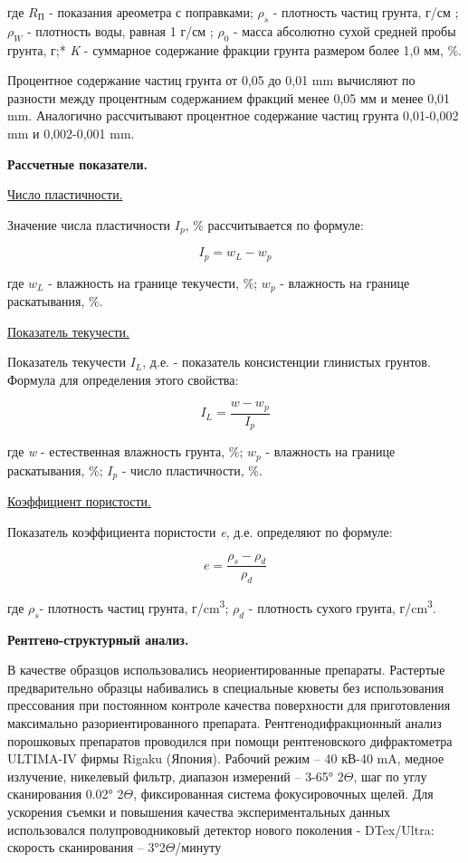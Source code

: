 где $R_\text{П}$ - показания ареометра с поправками;
$\rho_s$ - плотность частиц грунта, г/см ;
$\rho_W$ - плотность воды, равная 1 г/см ;
$\rho_0$ - масса абсолютно сухой средней пробы грунта, г;*
\textit{K} - суммарное содержание фракции грунта размером более 1,0 мм, \%.

Процентное содержание частиц грунта от 0,05 до 0,01 \si{\milli\meter} вычисляют по разности
между процентным содержанием фракций менее 0,05 мм и менее 0,01 \si{\milli\meter}.
Аналогично рассчитывают процентное содержание частиц грунта 0,01-0,002
\si{\milli\meter} и 0,002-0,001 \si{\milli\meter}.
 
\textbf{Рассчетные показатели.}

\underline{Число пластичности.}

 Значение числа пластичности \textit{$I_p$}, \% рассчитывается по формуле:

 \[
    \textit{$I_p$} = \textit{$w_L$} - \textit{$w_p$}
 \]

 где \textit{$w_L$} - влажность на границе текучести, \%;
 \textit{$w_p$} - влажность на границе раскатывания, \%.
 
\underline{Показатель текучести.}

 Показатель текучести \textit{$I_L$}, д.е. - показатель консистенции глинистых грунтов.
 Формула для определения этого свойства: 

\[
   \textit{$I_L$} = \frac{\textit{w} - \textit{$w_p$}}{\textit{$I_p$}}
\]

где \textit{w} - естественная влажность грунта, \%;
\textit{$w_p$} - влажность на границе раскатывания, \%;
\textit{$I_p$} - число пластичности, \%.

\underline{Коэффициент пористости.}

Показатель коэффициента пористости  \textit{e}, д.е. определяют по формуле: 

\[
   \textit{e} = \frac{\rho_s - \rho_d}{\rho_d}
\]

где $\rho_s$- плотность частиц грунта, г/\si{\centi\meter^3};
$\rho_d$ - плотность сухого грунта, г/\si{\centi\meter^3}.

\textbf{Рентгено-структурный анализ.}

В качестве образцов использовались неориентированные препараты. 
Растертые предварительно образцы набивались в специальные кюветы без использования прессования 
при постоянном контроле качества поверхности для приготовления максимально разориентированного препарата.
Рентгенодифракционный анализ порошковых препаратов проводился при помощи рентгеновского дифрактометра 
ULTIMA-IV фирмы Rigaku (Япония). Рабочий режим – 40 кВ-40 mA, медное излучение, никелевый фильтр, 
диапазон измерений – 3-65\si{\degree} 2$\Theta$, шаг по углу сканирования 0.02\si{\degree} 2$\Theta$, фиксированная система фокусировочных щелей. 
Для ускорения съемки и повышения качества экспериментальных данных использовался полупроводниковый детектор 
нового поколения -  DTex/Ultra: скорость сканирования – 3\si{\degree}2$\Theta$/минуту 

